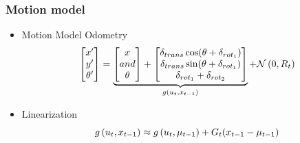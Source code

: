 \begin{frame}
    \frametitle{Motion model}
   
    \begin{itemize}
        \item Motion Model Odometry
    \begin{equation*}
    \begin{bmatrix}
    x^{\prime} \\
    y^{\prime} \\
    \theta^{\prime}
    \end{bmatrix} =
    \underbrace{
    \begin{bmatrix}
    x \\
    and \\
    \theta
    \end{bmatrix} +
    \begin{bmatrix}
    \delta_{trans}\cos(\theta+\delta_{rot_{1}}) \\
    \delta_{trans}\sin(\theta+\delta_{rot_{1}}) \\
    \delta_{rot_{1}} + \delta_{rot_{2}}
    \end{bmatrix}
    }_{g\left( u_{t}, x_{t-1} \right)} + \mathcal{N}\left( {0}, {R_{t}} \right)
    \end{equation*}
    \item Linearization
    \begin{equation*}
    g\left( u_{t}, x _{t-1} \right) \approx g\left( u_{t}, \mu _{t-1} \right) + G_{t}(x _{t-1}-\mu _{t-1})
    \end{equation*}
    \end{itemize}
   
\end{frame}
   
